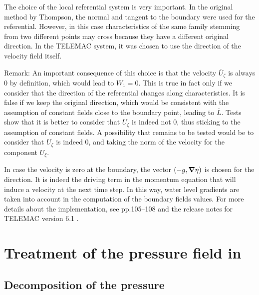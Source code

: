 The choice of the local referential system is very important.
In the original method by Thompson,
the normal and tangent to the boundary were used for the referential.
However, in this case characteristics of the same
family stemming from two different points may cross because they have a
different original direction.
In the TELEMAC system,
it was chosen to use the direction of the velocity field itself.\\
\begin{CommentBlock}{Remark:}
An important consequence of this choice is that the velocity $\overline{U}%
_{\zeta }$ is always 0 by definition, which would lead to $W_{1}=0$. This is
true in fact only if we consider that the direction of the referential
changes along characteristics. It is false if we keep the original direction,
which would be consistent with the assumption of constant fields close to the boundary point,
leading to $\overline{L}$. Tests show that it is better to consider that $%
U_{\zeta }$ is indeed not 0, thus sticking to the assumption of constant fields. A
possibility that remains to be tested would be to consider that $U_{\zeta }$
is indeed 0, and taking the norm of the velocity for the component $U_{\xi }$.
\end{CommentBlock}


In case the velocity is zero at the boundary, the vector $(-g,\bm{\nabla}\eta)$ is chosen
for the direction. It is indeed the driving term in the momentum equation
that will induce a velocity at the next time step. In this way, water level
gradients are taken into account in the computation of the boundary fields values.
For more details about the implementation, see \cite{hervouet007} pp.105--108
and the release notes for TELEMAC version 6.1 \cite{release61}.

\section{Treatment of the pressure field in }\label{sec:pressureStrategy}

\subsection{Decomposition of the pressure}

